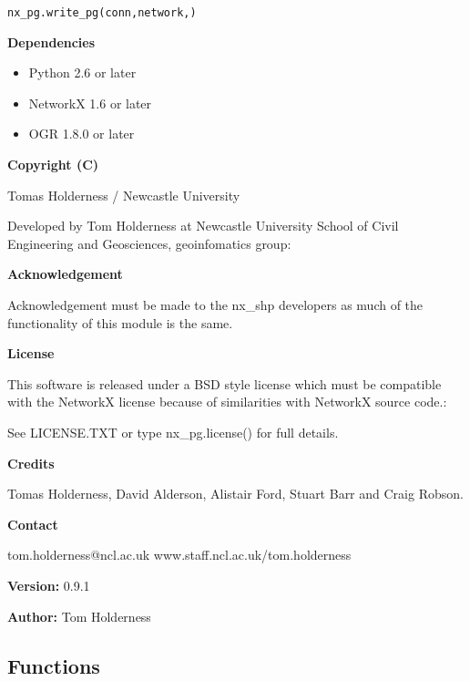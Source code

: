 \begin{alltt}
\pysrcprompt{{\textgreater}{\textgreater}{\textgreater} }nx\_pg.write\_pg(conn, network, )\end{alltt}
\textbf{Dependencies}

\begin{itemize}
\setlength{\parskip}{0.6ex}
  \item Python 2.6 or later

  \item NetworkX 1.6 or later

  \item OGR 1.8.0 or later

\end{itemize}

\textbf{Copyright (C)}

Tomas Holderness / Newcastle University

Developed by Tom Holderness at Newcastle University School of Civil 
Engineering and Geosciences, geoinfomatics group:

\textbf{Acknowledgement}

Acknowledgement must be made to the nx\_shp developers as much of the 
functionality of this module is the same.

\textbf{License}

This software is released under a BSD style license which must be 
compatible with the NetworkX license because of similarities with NetworkX 
source code.:

See LICENSE.TXT or type nx\_pg.license() for full details.

\textbf{Credits}

Tomas Holderness, David Alderson, Alistair Ford, Stuart Barr and Craig 
Robson.

\textbf{Contact}

tom.holderness@ncl.ac.uk www.staff.ncl.ac.uk/tom.holderness

\textbf{Version:} 0.9.1



\textbf{Author:} Tom Holderness





  \subsection{Functions}

